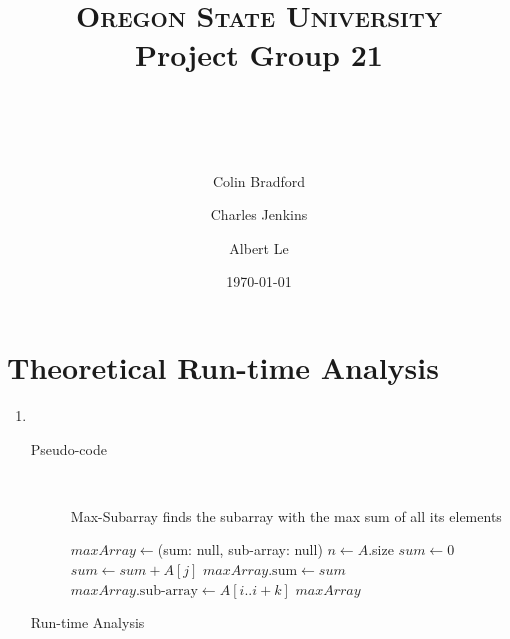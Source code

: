 \documentclass[paper=a4, fontsize=11pt]{scrartcl} %
\title{ 
    \normalfont \normalsize 
    \textsc{Oregon State University} \\ [25pt]
    \large Project Group 21
    \horrule{0.5pt} \\[0.4cm] %
    \huge \hwtitle \\ %
    \horrule{2pt} \\[0.5cm] %
}
\author{
    Colin Bradford
    \and
    Charles Jenkins
    \and
    Albert Le
} %
\date{\normalsize\today} %
\numberwithin{equation}{section} %
\numberwithin{figure}{section} %
\numberwithin{table}{section} %
\begin{document}
\maketitle %


\section{Theoretical Run-time Analysis}
\begin{enumerate}[label=\bfseries Algorithm \arabic*:]
    \item \hfill \\
    \begin{description}
        \item[Pseudo-code] \hfill \\
        \begin{algorithmc}
            \caption{Max-Subarray finds the subarray with the max sum of all its elements}
                \State $maxArray \gets $(sum: null, sub-array: null)
                \State $n \gets A$.size
                    \State $sum \gets 0$
                        \State $sum \gets sum + A[j]$
                    \EndFor
                        \State $maxArray. \textrm{sum} \gets sum$
                        \State $maxArray. \textrm{sub-array} \gets A[i..i + k]$
                    \EndIf
                \EndFor
                \State \Return $maxArray$
            \EndFunction
        \end{algorithmc}
        \item[Run-time Analysis] \hfill \\
    \end{description}


\end{enumerate}
\end{document}
